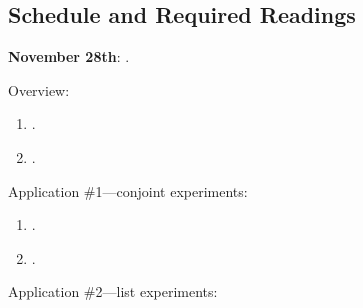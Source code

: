 \documentclass[letterpaper]{article}
\renewenvironment{itemize}{
  \begin{list}{}{
    \setlength{\leftmargin}{1.5em}
  }
}{
  \end{list}
}
\begin{document}
\subsection*{Schedule and Required Readings}


\begin{enumerate}
	\item {\bf November 28th}: {\color{ForestGreen}{\bf Survey Experiments}}.

			\begin{itemize} 

        \item[$\diamond$] Overview:

        \begin{enumerate}

          \item[$\bullet$] \href{https://www.cambridge.org/core/product/identifier/S1047198700006343/type/journal_article}{}.

          \item[$\bullet$] \href{https://www.cambridge.org/core/product/identifier/S2052263015000196/type/journal_article}{}.

        \end{enumerate}

       \item[$\diamond$] Application \#1---conjoint experiments:

           \begin{enumerate}

           \item[$\bullet$] \href{https://www.cambridge.org/core/product/identifier/9781108777919%23c2/type/book_part}{\fullcite{Bansak2021a}}.

           \item[$\bullet$] \href{https://www.cambridge.org/core/product/identifier/S1047198700013589/type/journal_article}{}.

         \end{enumerate}

        \item[$\diamond$] Application \#2---list experiments:

          \begin{enumerate}


\end{enumerate}
\end{itemize}
\end{enumerate}
\end{document}

